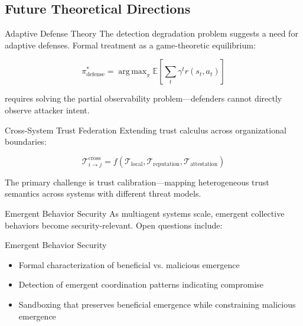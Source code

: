 \documentclass[
  ignorenonframetext,
]{beamer}
\DeclareMathOperator*{\argmax}{arg\,max}
\begin{document}
\subsection{Future Theoretical Directions}\label{sec:future-directions}

\begin{frame}[allowframebreaks]{Adaptive Defense Theory}
\protect{}\label{adaptive-defense-theory}
The detection degradation problem suggests a need for adaptive defenses.
Formal treatment as a game-theoretic equilibrium:

\begin{equation}
\label{eq:adaptive-defense}
\pi^{*}_{\text{defense}} = \argmax_{\pi} \mathbb{E}\left[\sum_t \gamma^t r(s_t, a_t)\right]
\end{equation}

requires solving the partial observability problem---defenders cannot
directly observe attacker intent.
\end{frame}

\begin{frame}[allowframebreaks]{Cross-System Trust Federation}
\protect{}\label{cross-system-trust-federation}
Extending trust calculus across organizational boundaries:

\begin{equation}
\label{eq:cross-system-trust}
\mathcal{T}_{i \to j}^{\text{cross}} = f(\mathcal{T}_{\text{local}}, \mathcal{T}_{\text{reputation}}, \mathcal{T}_{\text{attestation}})
\end{equation}

The primary challenge is trust calibration---mapping heterogeneous trust
semantics across systems with different threat models.
\end{frame}

\begin{frame}[allowframebreaks]{Emergent Behavior Security}
\protect{}\label{emergent-behavior-security}
As multiagent systems scale, emergent collective behaviors become
security-relevant. Open questions include:

\end{frame}

\begin{frame}[allowframebreaks]{Emergent Behavior Security}
\begin{itemize}
\item Formal characterization of beneficial vs. malicious emergence
\item Detection of emergent coordination patterns indicating compromise
\item Sandboxing that preserves beneficial emergence while constraining malicious emergence
\end{itemize}

\end{frame}
\end{document}
